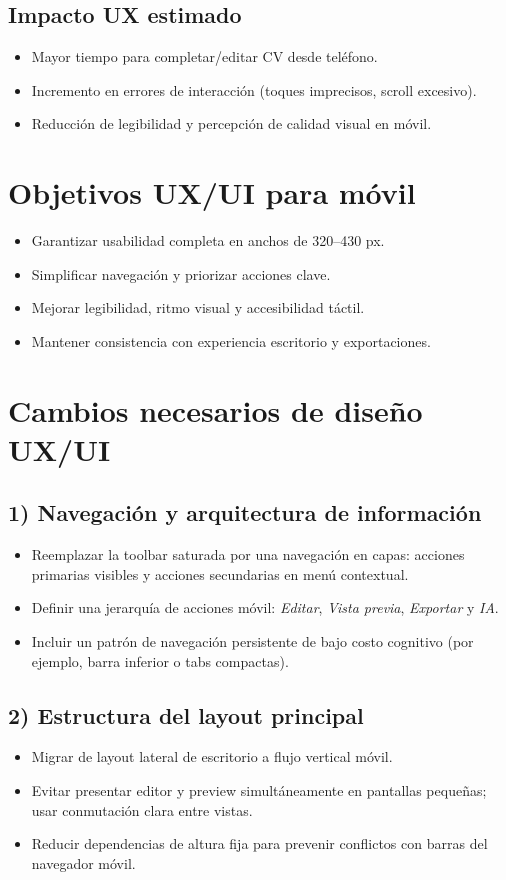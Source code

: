 \documentclass[12pt,a4paper]{article}
\begin{document}
\subsection{Impacto UX estimado}
\begin{itemize}[leftmargin=1.2cm]
  \item Mayor tiempo para completar/editar CV desde teléfono.
  \item Incremento en errores de interacción (toques imprecisos, scroll excesivo).
  \item Reducción de legibilidad y percepción de calidad visual en móvil.
\end{itemize}

\section{Objetivos UX/UI para móvil}
\begin{itemize}[leftmargin=1.2cm]
  \item Garantizar usabilidad completa en anchos de 320--430 px.
  \item Simplificar navegación y priorizar acciones clave.
  \item Mejorar legibilidad, ritmo visual y accesibilidad táctil.
  \item Mantener consistencia con experiencia escritorio y exportaciones.
\end{itemize}

\section{Cambios necesarios de diseño UX/UI}
\subsection{1) Navegación y arquitectura de información}
\begin{itemize}[leftmargin=1.2cm]
  \item Reemplazar la toolbar saturada por una navegación en capas: acciones primarias visibles y acciones secundarias en menú contextual.
  \item Definir una jerarquía de acciones móvil: \textit{Editar}, \textit{Vista previa}, \textit{Exportar} y \textit{IA}.
  \item Incluir un patrón de navegación persistente de bajo costo cognitivo (por ejemplo, barra inferior o tabs compactas).
\end{itemize}

\subsection{2) Estructura del layout principal}
\begin{itemize}[leftmargin=1.2cm]
  \item Migrar de layout lateral de escritorio a flujo vertical móvil.
  \item Evitar presentar editor y preview simultáneamente en pantallas pequeñas; usar conmutación clara entre vistas.
  \item Reducir dependencias de altura fija para prevenir conflictos con barras del navegador móvil.
\end{itemize}
\end{document}
